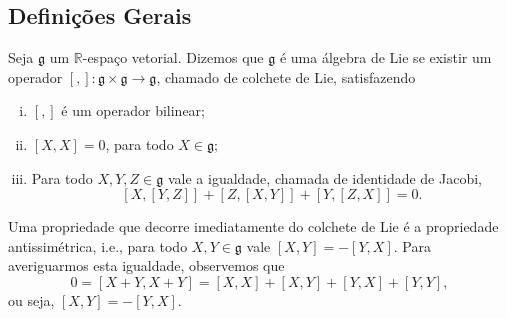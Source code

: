 \documentclass[twoside,openright,titlepage,numbers=noenddot,headinclude,  lineheaders footinclude=true,cleardoublepage=empty,
                                BCOR=5mm,paper=a4,fontsize=12pt ]{scrbook}
\theoremstyle{definition}
\begin{document}

\subsection{Defini\c{c}\~oes Gerais}
Seja $\mathfrak{g}$ um $\mathbb{R}$-espaço vetorial. Dizemos que $\mathfrak{g}$ é uma álgebra de Lie se existir
um operador $[,]: \mathfrak{g} \times \mathfrak{g} \rightarrow \mathfrak{g}$, chamado de colchete de Lie, satisfazendo
\begin{enumerate}[(i)]
	\item $[,]$ é um operador bilinear;
	\item $[X, X] = 0$, para todo $X \in \mathfrak{g}$;
	\item Para todo $X, Y, Z \in \mathfrak{g}$ vale a igualdade, chamada de identidade de Jacobi,
		\[ [X, [Y, Z] ] + [Z, [X, Y] ] + [Y, [Z, X] ] = 0 .\]
\end{enumerate} 
Uma propriedade que decorre imediatamente do colchete de Lie é a propriedade antissimétrica, i.e.,
para todo $X, Y \in \mathfrak{g}$ vale $[X, Y] = - [Y, X]$. Para averiguarmos esta igualdade, observemos que
\[ 0 = [X + Y, X + Y] = [X, X] + [X, Y] + [Y, X] + [Y, Y], \]
ou seja, $[X, Y] = -[Y, X]$.
\end{document}
